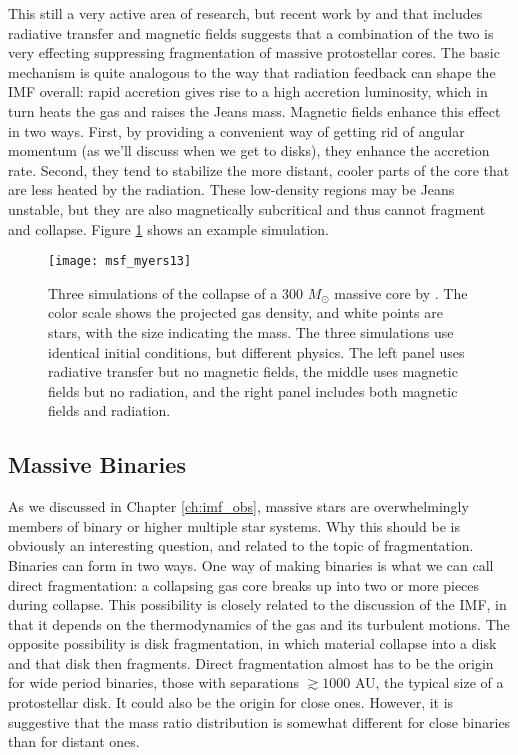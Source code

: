 This still a very active area of research, but recent work by \citet{commercon11c} and \citet{myers13a} that includes radiative transfer and magnetic fields suggests that a combination of the two is very effecting suppressing fragmentation of massive protostellar cores. The basic mechanism is quite analogous to the way that radiation feedback can shape the IMF overall: rapid accretion gives rise to a high accretion luminosity, which in turn heats the gas and raises the Jeans mass. Magnetic fields enhance this effect in two ways. First, by providing a convenient way of getting rid of angular momentum (as we'll discuss when we get to disks), they enhance the accretion rate. Second, they tend to stabilize the more distant, cooler parts of the core that are less heated by the radiation. These low-density regions may be Jeans unstable, but they are also magnetically subcritical and thus cannot fragment and collapse. Figure \ref{fig:msf_myers13} shows an example simulation.

\begin{figure}
\texttt{[image: msf\_myers13]}
\caption[Simulations of massive star formation with magnetic fields and radiation]{
\label{fig:msf_myers13}
Three simulations of the collapse of a 300 $M_\odot$ massive core by \citet{myers13a}. The color scale shows the projected gas density, and white points are stars, with the size indicating the mass. The three simulations use identical initial conditions, but different physics. The left panel uses radiative transfer but no magnetic fields, the middle uses magnetic fields but no radiation, and the right panel includes both magnetic fields and radiation.
}
\end{figure}

\subsection{Massive Binaries}

As we discussed in Chapter \ref{ch:imf_obs}, massive stars are overwhelmingly members of binary or higher multiple star systems. Why this should be is obviously an interesting question, and related to the topic of fragmentation. Binaries can form in two ways. One way of making binaries is what we can call direct fragmentation: a collapsing gas core breaks up into two or more pieces during collapse. This possibility is closely related to the discussion of the IMF, in that it depends on the thermodynamics of the gas and its turbulent motions. The opposite possibility is disk fragmentation, in which material collapse into a disk and that disk then fragments. Direct fragmentation almost has to be the origin for wide period binaries, those with separations $\gtrsim 1000$ AU, the typical size of a protostellar disk. It could also be the origin for close ones. However, it is suggestive that the mass ratio distribution is somewhat different for close binaries than for distant ones.

